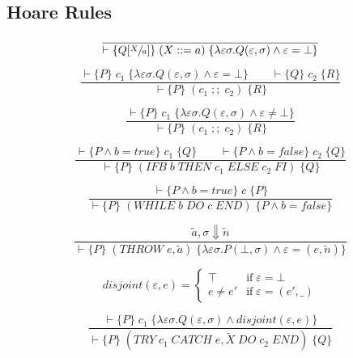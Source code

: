\subsection{Hoare Rules}

\begin{equation}
\frac{}{\vdash \{Q[\sfrac{X}{a}]\} \; (X ::= a) \; \{\lambda \varepsilon \sigma. Q(\varepsilon, \sigma) \wedge \varepsilon = \bot\}}
\end{equation}

\begin{equation}
\frac{\vdash \{P\} \; c_1 \; \{\lambda \varepsilon \sigma. Q(\varepsilon, \sigma) \wedge \varepsilon = \bot\} \qquad \vdash \{Q\} \; c_2 \; \{R\}}{\vdash \{P\} \; (c_1\; ;;\; c_2) \; \{R\}}
\end{equation}

\begin{equation}
\frac{\vdash \{P\} \; c_1 \; \{\lambda \varepsilon \sigma. Q(\varepsilon, \sigma) \wedge \varepsilon \neq \bot\}}{\vdash \{P\} \; (c_1\; ;;\; c_2) \; \{R\}}
\end{equation}

\begin{equation}
\frac{\vdash \{P \wedge b=true\} \; c_1 \; \{Q\} \qquad \vdash \{P \wedge b=false\} \; c_2 \; \{Q\}}{\vdash \{P\} \; (IFB\; b\; THEN\; c_1\; ELSE\; c_2\; FI) \; \{Q\}}
\end{equation}

\begin{equation}
\frac{\vdash \{P \wedge b = true\} \; c \; \{P\}}{\vdash \{P\} \; (WHILE\; b\; DO\; c\; END) \; \{P \wedge b = false\}}
\end{equation}

\begin{equation}
\frac{\tilde{a}, \sigma \Downarrow \tilde{n}}{\vdash \{P\} \; (THROW\; e, \tilde{a}) \; \{\lambda \varepsilon \sigma. P (\bot, \sigma) \wedge \varepsilon = (e, \tilde{n})\}}
\end{equation}

\begin{equation}
disjoint(\varepsilon, e) = \begin{cases}
\top & \mbox{if} \; \varepsilon = \bot \\
e \neq e' & \mbox{if} \; \varepsilon = (e', \_)
\end{cases}
\end{equation}

\begin{equation}
\frac{\vdash \{P\} \; c_1 \; \{\lambda \varepsilon \sigma. Q(\varepsilon, \sigma) \wedge disjoint(\varepsilon, e)\}}{\vdash \{P\} \; (TRY\; c_1\; CATCH\; e, \tilde{X}\; DO\; c_2\; END) \; \{Q\}}
\end{equation}

